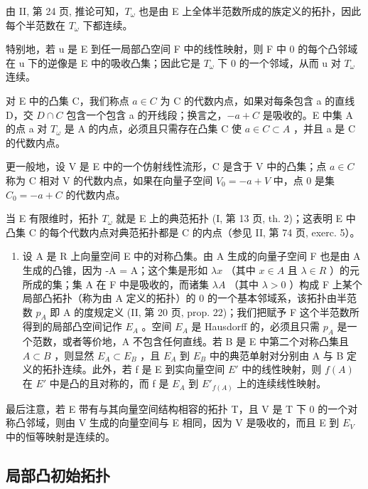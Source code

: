 由 II, 第 24 页, 推论可知，\(T_{\omega}\) 也是由 E 上全体半范数所成的族定义的拓扑，因此每个半范数在 \(T_{\omega}\) 下都连续。

特别地，若 u 是 E 到任一局部凸空间 F 中的线性映射，则 F 中 0 的每个凸邻域在 u 下的逆像是 E 中的吸收凸集；因此它是 \(T_{\omega}\) 下 0 的一个邻域，从而 u 对 \(T_{\omega}\) 连续。

对 E 中的凸集 C，我们称点 \(a \in C\) 为 C 的代数内点，如果对每条包含 a 的直线 D，交 \(D \cap C\) 包含一个包含 a 的开线段；换言之，\(-a + C\) 是吸收的。E 中集 A 的点 a 对 \(T_{\omega}\) 是 A 的内点，必须且只需存在凸集 C 使 \(a \in C \subset A\) ，并且 a 是 C 的代数内点。

更一般地，设 V 是 E 中的一个仿射线性流形，C 是含于 V 中的凸集；点 \(a \in C\) 称为 C 相对 V 的代数内点，如果在向量子空间 \(V_{0} = -a + V\) 中，点 0 是集 \(C_{0} = -a + C\) 的代数内点。

当 E 有限维时，拓扑 \(T_{\omega}\) 就是 E 上的典范拓扑 (I, 第 13 页, th. 2)；这表明 E 中凸集 C 的每个代数内点对典范拓扑都是 C 的内点（参见 II, 第 74 页, exerc. 5）。

\begin{enumerate}
\def\labelenumi{\arabic{enumi})}
\setcounter{enumi}{2}
\tightlist
\item
  设 A 是 R 上向量空间 E 中的对称凸集。由 A 生成的向量子空间 F 也是由 A 生成的凸锥，因为 -A = A；这个集是形如 \(\lambda x\) （其中 \(x \in A\) 且 \(\lambda \in R\) ）的元所成的集；集 A 在 F 中是吸收的，而诸集 \(\lambda A\) （其中 \(\lambda > 0\) ）构成 F 上某个局部凸拓扑（称为由 A 定义的拓扑）的 0 的一个基本邻域系，该拓扑由半范数 \(p_{A}\) 即 A 的度规定义 (II, 第 20 页, prop. 22)；我们把赋予 F 这个半范数所得到的局部凸空间记作 \(E_{A}\) 。空间 \(E_{A}\) 是 Hausdorff 的，必须且只需 \(p_{A}\) 是一个范数，或者等价地，A 不包含任何直线。若 B 是 E 中第二个对称凸集且 \(A \subset B\) ，则显然 \(E_{A} \subset E_{B}\) ，且 \(E_{A}\) 到 \(E_{B}\) 中的典范单射对分别由 A 与 B 定义的拓扑连续。此外，若 f 是 E 到实向量空间 \(E'\) 中的线性映射，则 \(f(A)\) 在 \(E'\) 中是凸的且对称的，而 f 是 \(E_{A}\) 到 \(E'_{f(A)}\) 上的连续线性映射。
\end{enumerate}

最后注意，若 E 带有与其向量空间结构相容的拓扑 T，且 V 是 T 下 0 的一个对称凸邻域，则由 V 生成的向量空间与 E 相同，因为 V 是吸收的，而且 E 到 \(E_{V}\) 中的恒等映射是连续的。

\subsection{局部凸初始拓扑}

